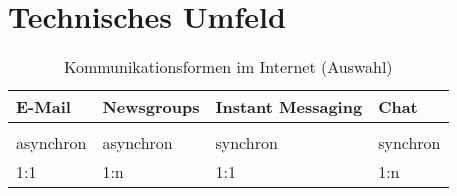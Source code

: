 \section{Technisches Umfeld}

\begin{table}[h]
\begin{tabular}{|l|l|l|l|}
\hline
E-Mail    & Newsgroups & Instant Messaging & Chat\\
\hline    &            &                   &\\
asynchron & asynchron  & synchron          & synchron\\
1:1       & 1:n        & 1:1               & 1:n\\
\hline
\end{tabular}
\caption{Kommunikationsformen im Internet (Auswahl)}
\end{table}